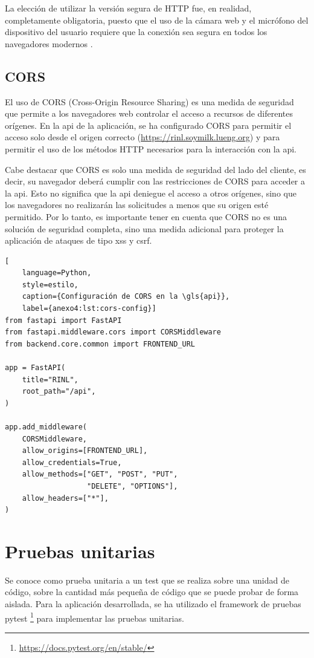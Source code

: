 La elección de utilizar la versión segura de HTTP fue, en realidad, completamente obligatoria, puesto
que el uso de la cámara web y el micrófono del dispositivo del usuario requiere que la conexión sea
segura en todos los navegadores modernos \parencite{MDNGetUserMedia}.

\subsection{CORS}
\label{anexo4:sec:conexiones-cors}
El uso de CORS (Cross-Origin Resource Sharing) es una medida de seguridad que permite a los
navegadores web controlar el acceso a recursos de diferentes orígenes. En la \gls{api} de la aplicación,
se ha configurado CORS para permitir el acceso solo desde el origen correcto
(\url{https://rinl.soymilk.lueng.org}) y para permitir el uso de los métodos HTTP necesarios para la
interacción con la \gls{api}.

Cabe destacar que CORS es solo una medida de seguridad del lado del cliente, es decir, su navegador
deberá cumplir con las restricciones de CORS para acceder a la \gls{api}. Esto no significa que la \gls{api}
deniegue el acceso a otros orígenes, sino que los navegadores no realizarán las solicitudes a menos
que su origen esté permitido. Por lo tanto, es importante tener en cuenta que CORS no es una
solución de seguridad completa, sino una medida adicional para proteger la aplicación de ataques
de tipo \gls{xss} y \gls{csrf}.

\begin{lstlisting}[
    language=Python,
    style=estilo,
    caption={Configuración de CORS en la \gls{api}},
    label={anexo4:lst:cors-config}]
from fastapi import FastAPI
from fastapi.middleware.cors import CORSMiddleware
from backend.core.common import FRONTEND_URL

app = FastAPI(
    title="RINL",
    root_path="/api",
)

app.add_middleware(
    CORSMiddleware,
    allow_origins=[FRONTEND_URL],
    allow_credentials=True,
    allow_methods=["GET", "POST", "PUT",
                   "DELETE", "OPTIONS"],
    allow_headers=["*"],
)
\end{lstlisting}

\section{Pruebas unitarias}
\label{anexo4:sec:pruebas}
Se conoce como prueba unitaria a un test que se realiza sobre una unidad de código, sobre la
cantidad más pequeña de código que se puede probar de forma aislada. Para la aplicación
desarrollada, se ha utilizado el framework de pruebas pytest
\footnote{\url{https://docs.pytest.org/en/stable/}} para implementar las pruebas unitarias.

